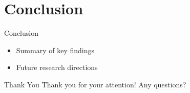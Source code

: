 \documentclass[
    NAME={Dr. Helga Ingimundardóttir},
    EMAIL={helgaingim@hi.is},
    FACULTY={Industrial Engineering},
    TITLE={Pushing Boundaries: A Data-Driven Dive into `Legend of the Ice People'},
    SUBTITLE={Unravel the unexpected synergy of literature and data science},
    SEMINAR={Haustráðstefna Advania},
    DATE={September 8, 2023}
    ]{hi-latex/hi-beamer}
\let\olditem\item
\renewcommand{\item}{\pause\olditem}
\begin{document}
\section{Conclusion}
\begin{frame}{Conclusion}
  \begin{itemize}
    \item Summary of key findings
    \item Future research directions
  \end{itemize}
\end{frame}

\begin{frame}{Thank You}
  Thank you for your attention! Any questions?
\end{frame}
\end{document}

